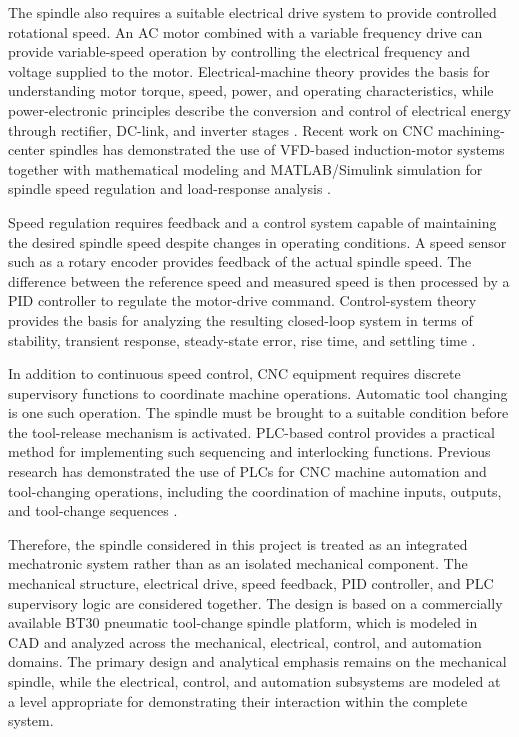 \documentclass[12pt,a4paper]{report}
\begin{document}
	The spindle also requires a suitable electrical drive system to provide controlled rotational speed. An AC motor combined with a variable frequency drive can provide variable-speed operation by controlling the electrical frequency and voltage supplied to the motor. Electrical-machine theory provides the basis for understanding motor torque, speed, power, and operating characteristics, while power-electronic principles describe the conversion and control of electrical energy through rectifier, DC-link, and inverter stages \cite{ref4,ref5,ref6,ref7,ref8}. Recent work on CNC machining-center spindles has demonstrated the use of VFD-based induction-motor systems together with mathematical modeling and MATLAB/Simulink simulation for spindle speed regulation and load-response analysis \cite{ref13}.
	
	Speed regulation requires feedback and a control system capable of maintaining the desired spindle speed despite changes in operating conditions. A speed sensor such as a rotary encoder provides feedback of the actual spindle speed. The difference between the reference speed and measured speed is then processed by a PID controller to regulate the motor-drive command. Control-system theory provides the basis for analyzing the resulting closed-loop system in terms of stability, transient response, steady-state error, rise time, and settling time \cite{ref9}.
	
	In addition to continuous speed control, CNC equipment requires discrete supervisory functions to coordinate machine operations. Automatic tool changing is one such operation. The spindle must be brought to a suitable condition before the tool-release mechanism is activated. PLC-based control provides a practical method for implementing such sequencing and interlocking functions. Previous research has demonstrated the use of PLCs for CNC machine automation and tool-changing operations, including the coordination of machine inputs, outputs, and tool-change sequences \cite{ref14,ref15}.
	
	Therefore, the spindle considered in this project is treated as an integrated mechatronic system rather than as an isolated mechanical component. The mechanical structure, electrical drive, speed feedback, PID controller, and PLC supervisory logic are considered together. The design is based on a commercially available BT30 pneumatic tool-change spindle platform, which is modeled in CAD and analyzed across the mechanical, electrical, control, and automation domains. The primary design and analytical emphasis remains on the mechanical spindle, while the electrical, control, and automation subsystems are modeled at a level appropriate for demonstrating their interaction within the complete system.
	
\end{document}
